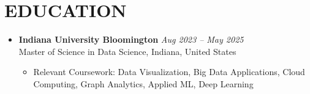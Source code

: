 \documentclass[letterpaper,11pt]{article}
\begin{document}
\section{\textbf{EDUCATION}}
  \begin{itemize}[leftmargin=0.15in, label={}]
    \item \textbf{Indiana University Bloomington} \hfill \textit{Aug 2023 -- May 2025} \\
    Master of Science in Data Science, Indiana, United States
    \begin{itemize}
        \item Relevant Coursework: Data Visualization, Big Data Applications, Cloud Computing, Graph Analytics, Applied ML, Deep Learning
    \end{itemize}
  \end{itemize}
\end{document}
